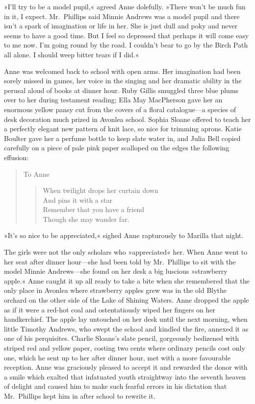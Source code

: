 »I'll try to be a model pupil,« agreed Anne dolefully. »There won't be much fun in it, I expect. Mr.~Phillips said Minnie Andrews was a model pupil and there isn't a spark of imagination or life in her. She is just dull and poky and never seems to have a good time. But I feel so depressed that perhaps it will come easy to me now. I'm going round by the road. I couldn't bear to go by the Birch Path all alone. I should weep bitter tears if I did.«

Anne was welcomed back to school with open arms. Her imagination had been sorely missed in games, her voice in the singing and her dramatic ability in the perusal aloud of books at dinner hour. Ruby Gillis smuggled three blue plums over to her during testament reading; Ella May MacPherson gave her an enormous yellow pansy cut from the covers of a floral catalogue—a species of desk decoration much prized in Avonlea school. Sophia Sloane offered to teach her a perfectly elegant new pattern of knit lace, so nice for trimming aprons. Katie Boulter gave her a perfume bottle to keep slate water in, and Julia Bell copied carefully on a piece of pale pink paper scalloped on the edges the following effusion:

\begin{quote}
\noindent To Anne

\begin{verse}
When twilight drops her curtain down\\
And pins it with a star\\
Remember that you have a friend\\
Though she may wander far.
\end{verse}
\end{quote}

»It's so nice to be appreciated,« sighed Anne rapturously to Marilla that night.

The girls were not the only scholars who »appreciated« her. When Anne went to her seat after dinner hour—she had been told by Mr.~Phillips to sit with the model Minnie Andrews—she found on her desk a big luscious »strawberry apple.« Anne caught it up all ready to take a bite when she remembered that the only place in Avonlea where strawberry apples grew was in the old Blythe orchard on the other side of the Lake of Shining Waters. Anne dropped the apple as if it were a red-hot coal and ostentatiously wiped her fingers on her handkerchief. The apple lay untouched on her desk until the next morning, when little Timothy Andrews, who swept the school and kindled the fire, annexed it as one of his perquisites. Charlie Sloane's slate pencil, gorgeously bedizened with striped red and yellow paper, costing two cents where ordinary pencils cost only one, which he sent up to her after dinner hour, met with a more favourable reception. Anne was graciously pleased to accept it and rewarded the donor with a smile which exalted that infatuated youth straightway into the seventh heaven of delight and caused him to make such fearful errors in his dictation that Mr.~Phillips kept him in after school to rewrite it.

